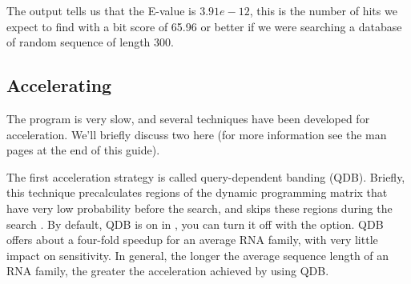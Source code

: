The output tells us that the E-value is $3.91e-12$, this is the number
of hits we expect to find with a bit score of 65.96 or better if we
were searching a database of random sequence of length 300.

\subsection{Accelerating }
The  program is very slow, and several techniques have
been developed for acceleration. We'll briefly discuss two here (for
more information see the  man pages at the end of this
guide).

The first acceleration strategy is called query-dependent banding
(QDB). Briefly, this technique precalculates regions of the dynamic programming
matrix that have very low probability before the search, and skips these
regions during the search \cite{NawrockiEddy07}. 
By default, QDB is on in , you can turn it off with the
 option. QDB offers about a four-fold speedup for an
average RNA family, with very little impact on sensitivity. In
general, the longer the average sequence length of an RNA family, the
greater the acceleration achieved by using QDB.

